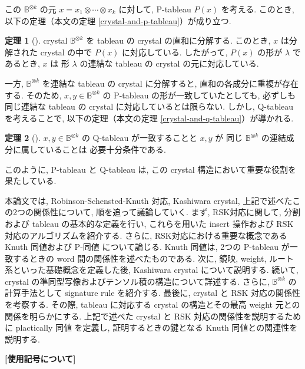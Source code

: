 \documentclass[
  a4paper, 
  12pt,
  ja=standard,
  xelatex,
  left=30truemm,
  right=30truemm,
  titlepage 
]{bxjsarticle}
\theoremstyle{definition}
\newtheorem{thm}{定理}[section]
\begin{document}
この $\mathbb{B}^{\otimes k}$ の元 $x = x_1 \otimes \cdots \otimes x_k$ に対して, P-tableau $P(x)$ を考える.  
このとき, 以下の定理（本文の定理 \ref{crystal-and-p-tableau}）が成り立つ.

\begin{thm}[{\cite[定理8.6]{b2}}]
  crystal $\mathbb{B}^{\otimes k}$ を tableau の crystal の直和に分解する.
  このとき, $x$ は分解された crystal の中で $P(x)$ に対応している.  
  したがって, $P(x)$ の形が $\lambda$ であるとき, $x$ は 形 $\lambda$ の連結な tableau の crystal の元に対応している.
\end{thm}

一方, $\mathbb{B}^{\otimes k}$ を連結な tableau の crystal に分解すると, 直和の各成分に重複が存在する.  
そのため, $x, y \in \mathbb{B}^{\otimes k}$ の P-tableau の形が一致していたとしても, 必ずしも同じ連結な tableau の crystal に対応しているとは限らない.  
しかし, Q-tableau を考えることで, 以下の定理（本文の定理 \ref{crystal-and-q-tableau}）が導かれる.

\begin{thm}[{\cite[定理8.7]{b2}}]
  $x, y \in \mathbb{B}^{\otimes k}$ の Q-tableau が一致することと
  $x, y$ が 同じ $\mathbb{B}^{\otimes k}$ の連結成分に属していることは
  必要十分条件である.
\end{thm}

このように, P-tableau と Q-tableau は, この crystal 構造において重要な役割を果たしている.

本論文では, Robinson-Schensted-Knuth 対応, Kashiwara crystal, 上記で述べたこの2つの関係性について,
順を追って議論していく.
まず, RSK対応に関して, 分割および tableau の基本的な定義を行い, 
これらを用いた insert 操作および RSK 対応のアルゴリズムを紹介する.
さらに, RSK対応における重要な概念である Knuth 同値および P-同値 について論じる.
Knuth 同値は, 2つの P-tableau が一致するときの word 間の関係性を述べたものである.
次に, 鏡映, weight, ルート系といった基礎概念を定義した後, 
Kashiwara crystal について説明する.
続いて, crystal の準同型写像およびテンソル積の構造について詳述する. 
さらに,  $\mathbb{B}^{\otimes k}$ の計算手法として signature rule を紹介する.
最後に, crystal と RSK 対応の関係性を考察する. 
その際, tableau に対応する crystal の構造とその最高 weight 元との関係を明らかにする.
上記で述べた crystal と RSK 対応の関係性を説明するために
plactically 同値 を定義し, 証明するときの鍵となる Knuth 同値との関連性を説明する.

\begin{center} \textbf{[使用記号について]} \end{center}
\end{document}
